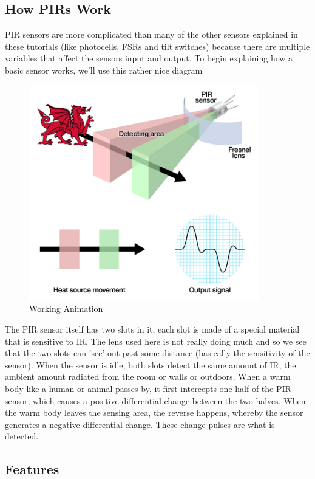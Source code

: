 \documentclass[twoside,a4paper,16pt]{book}
\begin{document}
{\subsection*{How PIRs Work}
PIR sensors are more complicated than many of the other sensors explained in these tutorials (like photocells, FSRs and tilt switches) because there are multiple variables that affect the sensors input and output. To begin explaining how a basic sensor works, we'll use this rather nice diagram
\begin{figure}[ht!]
	\begin{center}
		\includegraphics[width=10.0cm]{15.png}
		\caption{Working Animation}
	\end{center}
\end{figure}
The PIR sensor itself has two slots in it, each slot is made of a special material that is sensitive to IR. The lens used here is not really doing much and so we see that the two slots can 'see' out past some distance (basically the sensitivity of the sensor). When the sensor is idle, both slots detect the same amount of IR, the ambient amount radiated from the room or walls or outdoors. When a warm body like a human or animal passes by, it first intercepts one half of the PIR sensor, which causes a positive differential change between the two halves. When the warm body leaves the sensing area, the reverse happens, whereby the sensor generates a negative differential change. These change pulses are what is detected.
\subsection*{Features}

}
\end{document}
